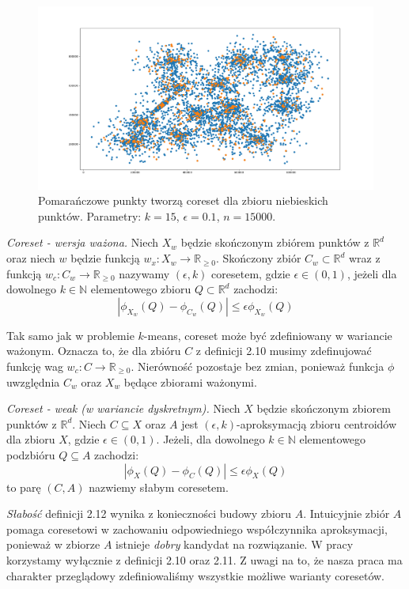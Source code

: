 \begin{figure}[H]
    \centering
    \includegraphics[totalheight=7cm]{coreset.png}
    \caption{Pomarańczowe punkty tworzą coreset dla zbioru niebieskich punktów. 
    Parametry: $k=15$, $\epsilon = 0.1$, $n = 15000$.}
\end{figure}

\begin{definition}
    \emph{Coreset - wersja ważona.} Niech $X_{w}$ będzie skończonym zbiórem punktów z $\mathbb{R}^{d}$ oraz niech $w$ będzie funkcją $w_{x}: X_{w} \rightarrow \mathbb{R}_{\ge0}$.
    Skończony zbiór $C_{w} \subset \mathbb{R}^{d}$ wraz z funkcją $w_{c}: C_{w} \rightarrow \mathbb{R}_{\ge0}$ nazywamy $(\epsilon, k)$ coresetem, gdzie $\epsilon \in (0, 1)$, jeżeli dla dowolnego $k \in \mathbb{N}$ elementowego zbioru $Q \subset \mathbb{R}^{d}$ zachodzi:
    \begin{equation}
        |\phi_{X_{w}}(Q) - \phi_{C_{w}}(Q)| \leq \epsilon\phi_{X_{w}}(Q)
    \end{equation}
\end{definition}

\noindent
Tak samo jak w problemie $k$-means, coreset może być zdefiniowany w wariancie ważonym.
Oznacza to, że dla zbióru $C$ z definicji 2.10  musimy zdefinujować funkcję wag $w_{c}: C \rightarrow \mathbb{R}_{\ge0}$.
Nierówność pozostaje bez zmian, ponieważ funkcja $\phi$ uwzględnia $C_{w}$ oraz $X_{w}$ będące zbiorami ważonymi.

\begin{definition}
    \emph{Coreset - weak (w wariancie dyskretnym).} Niech $X$ będzie skończonym zbiorem punktów z $\mathbb{R}^{d}$.
    Niech $C \subseteq X$ oraz $A$ jest $(\epsilon, k)$-aproksymacją zbioru centroidów dla zbioru $X$, gdzie $\epsilon \in (0, 1)$.
    Jeżeli, dla dowolnego $k \in \mathbb{N}$ elementowego podzbióru $Q \subseteq A$ zachodzi:
    \begin{equation}
        |\phi_{X}(Q) - \phi_{C}(Q)| \leq \epsilon\phi_{X}(Q)
    \end{equation}
    to parę $(C, A)$ nazwiemy słabym coresetem.
\end{definition}

\noindent
\textit{Słabość} definicji 2.12 wynika z konieczności budowy zbioru $A$.
Intuicyjnie zbiór $A$ pomaga coresetowi w zachowaniu odpowiedniego współczynnika aproksymacji, ponieważ w zbiorze $A$ istnieje \textit{dobry} kandydat na rozwiązanie.
W pracy korzystamy wyłącznie z definicji 2.10 oraz 2.11.
Z uwagi na to, że nasza praca ma charakter przeglądowy zdefiniowaliśmy wszystkie możliwe warianty coresetów.